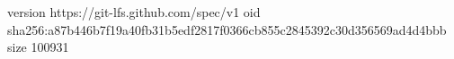 version https://git-lfs.github.com/spec/v1
oid sha256:a87b446b7f19a40fb31b5edf2817f0366cb855c2845392c30d356569ad4d4bbb
size 100931
